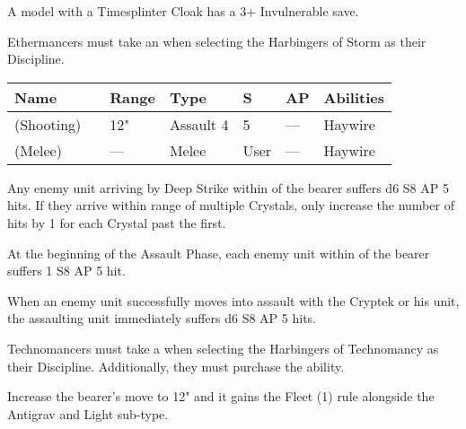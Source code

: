 
A model with a Timesplinter Cloak has a 3+ Invulnerable save.




Ethermancers must take an  when selecting the Harbingers of Storm as their Discipline.

\label{Voltaic Staff}
\noindent
\begin{tabular}{||m{130pt} m{10pt} m{31pt} m{55pt} m{12pt} m{12pt} m{210pt}||}
	\hline
	Name & & Range & Type & S & AP & Abilities \\
	\hline
	\quickref{Voltaic Staff} (Shooting) & & 12" & Assault 4 & 5 & — & Haywire \\
	\quickref{Voltaic Staff} (Melee) & & — & Melee & User & — & Haywire \\
	\hline
\end{tabular}


Any enemy unit arriving by Deep Strike within  of the bearer suffers d6 S8 AP 5 hits. If they arrive within range of multiple Crystals, only increase the number of hits by 1 for each Crystal past the first.


At the beginning of the Assault Phase, each enemy unit within  of the bearer suffers 1 S8 AP 5 hit.


When an enemy unit successfully moves into assault with the Cryptek or his unit, the assaulting unit immediately suffers d6 S8 AP 5 hits.





Technomancers must take a  when selecting the Harbingers of Technomancy as their Discipline. Additionally, they must purchase the  ability.


Increase the bearer's move to 12" and it gains the Fleet (1) rule alongside the Antigrav and Light sub-type.

